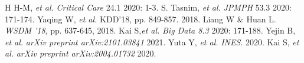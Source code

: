 {\footnotesize 
\begin{twobibliography}{99}
    \setlength{\parskip}{0cm}
    \setlength{\itemsep}{0cm}
     H H-M, \textit{et al.} \textit{Critical Care} 24.1 2020: 1-3.
     S. Tasnim, \textit{et al.} \textit{JPMPH} 53.3 2020: 171-174.
     Yaqing W, \textit{et al.} {KDD'18}, pp. 849-857. 2018.
     Liang W \& Huan L. \textit{WSDM '18},  pp. 637-645, 2018.
     Kai S,\textit{et al.} \textit{Big Data 8.3} 2020: 171-188.
     Yejin B, \textit{et al.} \textit{arXiv preprint arXiv:2101.03841} 2021.
     Yuta Y, \textit{et al.} \textit{INES}. 2020.
     Kai S, \textit{et al.}  \textit{arXiv preprint arXiv:2004.01732} 2020.
\end{twobibliography}
}


